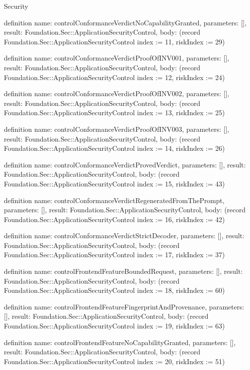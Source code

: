 \begin{lexlean}{Security}
\begin{semanticmodule}
definition{
  name: controlConformanceVerdictNoCapabilityGranted,
  parameters: [],
  result: Foundation.Sec::ApplicationSecurityControl,
  body: (record Foundation.Sec::ApplicationSecurityControl {index := 11, riskIndex := 29})
}

definition{
  name: controlConformanceVerdictProofOfINV001,
  parameters: [],
  result: Foundation.Sec::ApplicationSecurityControl,
  body: (record Foundation.Sec::ApplicationSecurityControl {index := 12, riskIndex := 24})
}

definition{
  name: controlConformanceVerdictProofOfINV002,
  parameters: [],
  result: Foundation.Sec::ApplicationSecurityControl,
  body: (record Foundation.Sec::ApplicationSecurityControl {index := 13, riskIndex := 25})
}

definition{
  name: controlConformanceVerdictProofOfINV003,
  parameters: [],
  result: Foundation.Sec::ApplicationSecurityControl,
  body: (record Foundation.Sec::ApplicationSecurityControl {index := 14, riskIndex := 26})
}

definition{
  name: controlConformanceVerdictProvedVerdict,
  parameters: [],
  result: Foundation.Sec::ApplicationSecurityControl,
  body: (record Foundation.Sec::ApplicationSecurityControl {index := 15, riskIndex := 43})
}

definition{
  name: controlConformanceVerdictRegeneratedFromThePrompt,
  parameters: [],
  result: Foundation.Sec::ApplicationSecurityControl,
  body: (record Foundation.Sec::ApplicationSecurityControl {index := 16, riskIndex := 42})
}

definition{
  name: controlConformanceVerdictStrictDecoder,
  parameters: [],
  result: Foundation.Sec::ApplicationSecurityControl,
  body: (record Foundation.Sec::ApplicationSecurityControl {index := 17, riskIndex := 37})
}

definition{
  name: controlFrontendFeatureBoundedRequest,
  parameters: [],
  result: Foundation.Sec::ApplicationSecurityControl,
  body: (record Foundation.Sec::ApplicationSecurityControl {index := 18, riskIndex := 60})
}

definition{
  name: controlFrontendFeatureFingerprintAndProvenance,
  parameters: [],
  result: Foundation.Sec::ApplicationSecurityControl,
  body: (record Foundation.Sec::ApplicationSecurityControl {index := 19, riskIndex := 63})
}

definition{
  name: controlFrontendFeatureNoCapabilityGranted,
  parameters: [],
  result: Foundation.Sec::ApplicationSecurityControl,
  body: (record Foundation.Sec::ApplicationSecurityControl {index := 20, riskIndex := 51})
}


\end{semanticmodule}
\end{lexlean}

